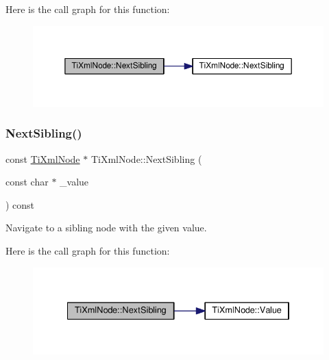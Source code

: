 Here is the call graph for this function\+:\nopagebreak
\begin{figure}[H]
\begin{center}
\leavevmode
\includegraphics[width=350pt]{class_ti_xml_node_a4d05f7b1d7b470ac6887edd072d4892a_cgraph}
\end{center}
\end{figure}
\mbox{\label{class_ti_xml_node_a0864ea784b53cdca0a37829d3391ca4b}} 
\subsubsection{\texorpdfstring{Next\+Sibling()}{NextSibling()}\hspace{0.1cm}{\footnotesize\ttfamily [3/4]}}
{\footnotesize\ttfamily const \hyperlink{class_ti_xml_node}{Ti\+Xml\+Node} $\ast$ Ti\+Xml\+Node\+::\+Next\+Sibling (\begin{DoxyParamCaption}\item[{const char $\ast$}]{\+\_\+value }\end{DoxyParamCaption}) const}



Navigate to a sibling node with the given \textquotesingle{}value\textquotesingle{}. 

Here is the call graph for this function\+:\nopagebreak
\begin{figure}[H]
\begin{center}
\leavevmode
\includegraphics[width=334pt]{class_ti_xml_node_a0864ea784b53cdca0a37829d3391ca4b_cgraph}
\end{center}
\end{figure}
\mbox{\label{class_ti_xml_node_a4080bc5cc8a5c139e7cf308669e850fc}} 
